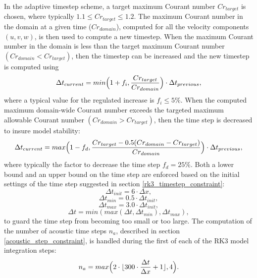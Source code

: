 In the adaptive timestep scheme, a target maximum Courant number
$Cr_{target}$ is chosen, where typically $1.1 \leq Cr_{target} \leq
1.2$.  The maximum Courant number in the domain at a given time ($Cr_{domain}$), computed
for all the velocity components $(u,v,w)$, is then used to compute a new
timestep.  When the maximum Courant number in the domain is less than
the target maximum Courant number $(Cr_{domain} < Cr_{target})$, 
then the timestep can be increased
and the new timestep is computed using
%
\begin{equation}
\Delta t_{current} = min \Big( 1+f_{i} , 
{Cr_{target} \over Cr_{domain}}\Big) \cdot \Delta t_{previous},
\label{adapt_inc_timestep}
\end{equation}
%
\noindent
where a typical value for the regulated increase is $f_{i} \leq 5\%$.  When
the computed maximum domain-wide Courant number exceeds the targeted
maximum allowable Courant number $(Cr_{domain} > Cr_{target})$, 
then the time step is 
decreased to insure model stability:
%
\begin{equation}
\Delta t_{current} = max \Big( 1-f_{d} , 
{{Cr_{target} - {0.5 ({Cr_{domain} - Cr_{target}}) }} 
\over Cr_{domain} } \Big) \cdot \Delta t_{previous},
\label{adapt_dec_timestep}
\end{equation}
%
\noindent
where typically the factor to decrease the time step $f_{d} = 25\%$.  Both a lower bound and
an upper bound on the time step are enforced based on the initial settings 
of the time step suggested in section \ref{rk3_timestep_constraint}:
%
\begin{equation}
\Delta t_{init}  = 6 \cdot \Delta x ,
\label{adapt_init_timestep}
\end{equation}
\begin{equation}
\Delta t_{min} = 0.5 \cdot \Delta t_{init},
\label{adapt_bound_min_timestep}
\end{equation}
\begin{equation}
\Delta t_{max} = 3.0 \cdot \Delta t_{init},
\label{adapt_bound_max_timestep}
\end{equation}
\begin{equation}
\Delta t = min ( max ( \Delta t, \Delta t_{min} ) , \Delta t_{max} ),
\label{adapt_bound_timestep}
\end{equation}
%
\noindent
to guard the time step from becoming too small or too large.  
The computation of the number of acoustic time steps $n_a$, described in section
\ref{acoustic_step_constraint}, is handled during the first of each of the
RK3 model integration steps:
%
\begin{equation}
n_a
= max \Big( 2 \cdot \lfloor { 300 \cdot {\Delta t \over \Delta x} + 1 } \rfloor , 4 \Big).
\label{adapt_acoustic_timestep}
\end{equation}
%

